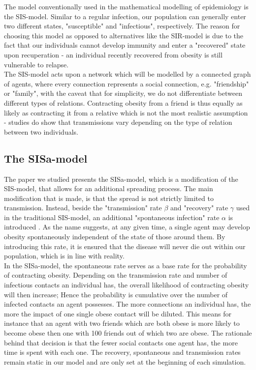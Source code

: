 \documentclass[11pt]{article}
\begin{document}
The model conventionally used in the mathematical modelling of epidemiology is the SIS-model. Similar to a regular infection, our population can generally enter two different states, "susceptible" and "infectious", respectively. The reason for choosing this model as opposed to alternatives like the SIR-model is due to the fact that our individuals cannot develop immunity and enter a "recovered" state upon recuperation - an individual recently recovered from obesity is still vulnerable to relapse.\cite{infectiousDiseaseModeling}  \\

The SIS-model acts upon a network which will be modelled by a connected graph of agents, where every connection represents a social connection, e.g. "friendship" or "family", with the caveat that for simplicity, we do not differentiate between different types of relations. Contracting obesity from a friend is thus equally as likely as contracting it from a relative which is not the most realistic assumption - studies do show that transmissions vary depending on the type of relation between two individuals\cite{spreadOfObesityPaper}.

\subsection{The SISa-model} \label{section:SISa-model}

The paper we studied presents the SISa-model, which is a modification of the SIS-model, that allows for an additional spreading process. The main modification that is made, is that the spread is not strictly limited to transmission. Instead, beside the "transmission" rate  \(\beta\)  and "recovery" rate \(\gamma\) used in the traditional SIS-model, an additional "spontaneous infection" rate \(\alpha\) is introduced \cite{infectiousDiseaseModeling}. As the name suggests, at any given time, a single agent may develop obesity spontaneously independent of the state of those around them. By introducing this rate, it is ensured that the disease will never die out within our population, which is in line with reality.\\

In the SISa-model, the spontaneous rate serves as a base rate for the probability of contracting obesity. Depending on the transmission rate and number of infectious contacts an individual has, the overall likelihood of contracting obesity will then increase; Hence the probability is cumulative over the number of infected contacts an agent possesses. The more connections an individual has, the more the impact of one single obese contact will be diluted. This means for instance that an agent with two friends which are both obese is more likely to become obese then one with 100 friends out of which two are obese. The rationale behind that decision is that the fewer social contacts one agent has, the more time is spent with each one. The recovery, spontaneous and transmission rates remain static in our model and are only set at the beginning of each simulation.
\end{document}
